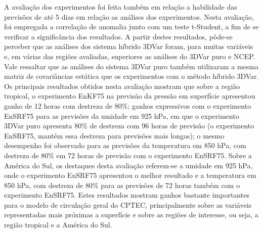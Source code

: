 A avaliação dos experimentos foi feita também em relação a habilidade das previsões de até 5 dias em relação as análises dos experimentos. Nesta avaliação, foi empregada a correlação de anomalia junto com um teste t-Student, a fim de se verificar a significância dos resultados. A partir destes resultados, pôde-se perceber que as análises dos sistema híbrido 3DVar foram, para muitas variáveis e, em várias das regiões avaliadas, superiores as análises do 3DVar puro e NCEP. Vale ressaltar que as análises do sistema 3DVar puro também utilizaram a mesma matriz de covariâncias estática que os experimentos com o método híbrido 3DVar. Os principais resultados obtidos nesta avaliação mostram que sobre a região tropical, o experimento EnKF75 na previsão da pressão em superfície apresentou ganho de 12 horas com destreza de 80\%; ganhos expressivos com o experimento EnSRF75 para as previsões da umidade em 925 hPa, em que o experimento 3DVar puro apresenta 80\% de destreza com 96 horas de previsão (o experimento EnSRF75, mantém essa destreza para previsões mais longas); o mesmo desempenho foi observado para as previsões da temperatura em 850 hPa, com destreza de 80\% em 72 horas de previsão com o experimento EnSRF75. Sobre a América do Sul, os destaques desta avaliação referem-se a umidade em 925 hPa, onde o experimento EnSRF75 apresentou o melhor resultado e a temperatura em 850 hPa, com destreza de 80\% para as previsões de 72 horas também com o experimento EnSRF75. Estes resultados mostram ganhos bastante importantes para o modelo de circulação geral do CPTEC, principalmente sobre as variáveis representadas mais próximas a superfície e sobre as regiões de interesse, ou seja, a região tropical e a América do Sul.

